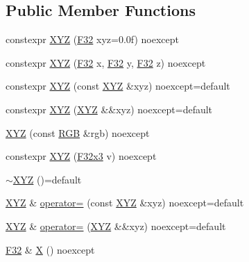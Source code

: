\subsection*{Public Member Functions}
\begin{DoxyCompactItemize}
\item 
constexpr \mbox{\hyperlink{structmage_1_1_x_y_z_af8b9ef53daa7463097c6397644a24ebf}{X\+YZ}} (\mbox{\hyperlink{namespacemage_aa97e833b45f06d60a0a9c4fc22ae02c0}{F32}} xyz=0.\+0f) noexcept
\item 
constexpr \mbox{\hyperlink{structmage_1_1_x_y_z_af1a6e6dd912ef8513640bd7a45af01d5}{X\+YZ}} (\mbox{\hyperlink{namespacemage_aa97e833b45f06d60a0a9c4fc22ae02c0}{F32}} x, \mbox{\hyperlink{namespacemage_aa97e833b45f06d60a0a9c4fc22ae02c0}{F32}} y, \mbox{\hyperlink{namespacemage_aa97e833b45f06d60a0a9c4fc22ae02c0}{F32}} z) noexcept
\item 
constexpr \mbox{\hyperlink{structmage_1_1_x_y_z_a340b36d0ef87c20f3ff4123e71fb6894}{X\+YZ}} (const \mbox{\hyperlink{structmage_1_1_x_y_z}{X\+YZ}} \&xyz) noexcept=default
\item 
constexpr \mbox{\hyperlink{structmage_1_1_x_y_z_abfabc56fbe50948bc3d894178685453a}{X\+YZ}} (\mbox{\hyperlink{structmage_1_1_x_y_z}{X\+YZ}} \&\&xyz) noexcept=default
\item 
\mbox{\hyperlink{structmage_1_1_x_y_z_a7502d9fa2f8d6bf59d00bcdb45c4fcd0}{X\+YZ}} (const \mbox{\hyperlink{structmage_1_1_r_g_b}{R\+GB}} \&rgb) noexcept
\item 
constexpr \mbox{\hyperlink{structmage_1_1_x_y_z_af2edf71f76a8c7d457229adaf904fb07}{X\+YZ}} (\mbox{\hyperlink{namespacemage_a1e3c7a882af461f161caa1cbddaf1fa2}{F32x3}} v) noexcept
\item 
\mbox{\hyperlink{structmage_1_1_x_y_z_a07eb7ce1ad3308774b0bbad3a7f121ce}{$\sim$\+X\+YZ}} ()=default
\item 
\mbox{\hyperlink{structmage_1_1_x_y_z}{X\+YZ}} \& \mbox{\hyperlink{structmage_1_1_x_y_z_a817c69124934fa9ad5d7d63b5696c939}{operator=}} (const \mbox{\hyperlink{structmage_1_1_x_y_z}{X\+YZ}} \&xyz) noexcept=default
\item 
\mbox{\hyperlink{structmage_1_1_x_y_z}{X\+YZ}} \& \mbox{\hyperlink{structmage_1_1_x_y_z_aa8b016328f6210e3b0b13cff7087dbee}{operator=}} (\mbox{\hyperlink{structmage_1_1_x_y_z}{X\+YZ}} \&\&xyz) noexcept=default
\item 
\mbox{\hyperlink{namespacemage_aa97e833b45f06d60a0a9c4fc22ae02c0}{F32}} \& \mbox{\hyperlink{structmage_1_1_x_y_z_a13f2b286fbf7330f0228844e56cff9ff}{X}} () noexcept
\item 

\end{DoxyCompactItemize}
